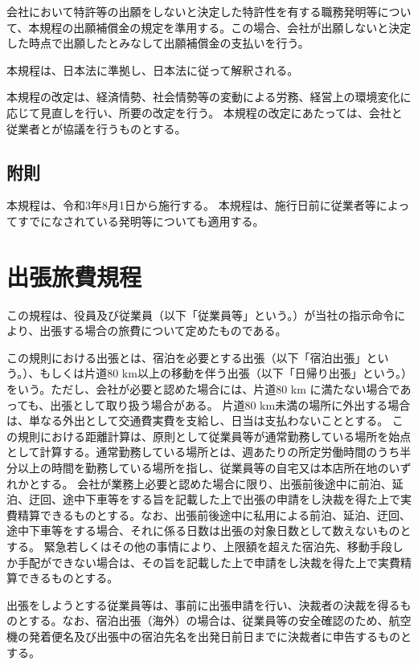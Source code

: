 \documentclass[10pt,a4paper,uplatex]{jsarticle}
\begin{document}
会社において特許等の出願をしないと決定した特許性を有する職務発明等について、本規程の出願補償金の規定を準用する。この場合、会社が出願しないと決定した時点で出願したとみなして出願補償金の支払いを行う。

本規程は、日本法に準拠し、日本法に従って解釈される。

本規程の改定は、経済情勢、社会情勢等の変動による労務、経営上の環境変化に応じて見直しを行い、所要の改定を行う。
\term 本規程の改定にあたっては、会社と従業者とが協議を行うものとする。

\subsection*{附則}
本規程は、令和3年8月1日から施行する。
本規程は、施行日前に従業者等によってすでになされている発明等についても適用する。

\clearpage
\section{出張旅費規程}

この規程は、役員及び従業員（以下「従業員等」という。）が当社の指示命令により、出張する場合の旅費について定めたものである。

この規則における出張とは、宿泊を必要とする出張（以下「宿泊出張」という。）、もしくは片道80 km以上の移動を伴う出張（以下「日帰り出張」という。）をいう。ただし、会社が必要と認めた場合には、片道80 km に満たない場合であっても、出張として取り扱う場合がある。
\term 片道80 km未満の場所に外出する場合は、単なる外出として交通費実費を支給し、日当は支払わないこととする。
\term この規則における距離計算は、原則として従業員等が通常勤務している場所を始点として計算する。通常勤務している場所とは、週あたりの所定労働時間のうち半分以上の時間を勤務している場所を指し、従業員等の自宅又は本店所在地のいずれかとする。
\term 会社が業務上必要と認めた場合に限り、出張前後途中に前泊、延泊、迂回、途中下車等をする旨を記載した上で出張の申請をし決裁を得た上で実費精算できるものとする。なお、出張前後途中に私用による前泊、延泊、迂回、途中下車等をする場合、それに係る日数は出張の対象日数として数えないものとする。
\term 緊急若しくはその他の事情により、上限額を超えた宿泊先、移動手段しか手配ができない場合は、その旨を記載した上で申請をし決裁を得た上で実費精算できるものとする。

出張をしようとする従業員等は、事前に出張申請を行い、決裁者の決裁を得るものとする。なお、宿泊出張（海外）の場合は、従業員等の安全確認のため、航空機の発着便名及び出張中の宿泊先名を出発日前日までに決裁者に申告するものとする。
\end{document}
